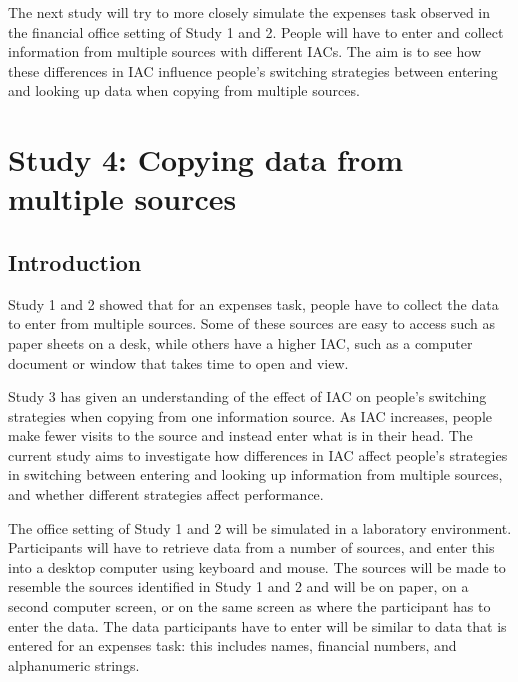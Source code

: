 \documentclass[11pt,oneside]{report}
\begin{document}
\begin{table}
The next study will try to more closely simulate the expenses task observed in the financial office setting of Study 1 and 2. People will have to enter and collect information from multiple sources with different IACs. The aim is to see how these differences in IAC influence people's switching strategies between entering and looking up data when copying from multiple sources. 



\section{Study 4: Copying data from multiple sources}
 
\subsection{Introduction}
Study 1 and 2 showed that for an expenses task, people have to collect the data to enter from multiple sources. Some of these sources are easy to access such as paper sheets on a desk, while others have a higher IAC, such as a computer document or window that takes time to open and view.

Study 3 has given an understanding of the effect of IAC on people's switching strategies when copying from one information source. As IAC increases, people make fewer visits to the source and instead enter what is in their head. 
The current study aims to investigate how differences in IAC affect people's strategies in switching between entering and looking up information from multiple sources, and whether different strategies affect performance.

The office setting of Study 1 and 2 will be simulated in a laboratory environment. Participants will have to retrieve data from a number of sources, and enter this into a desktop computer using keyboard and mouse. The sources will be made to resemble the sources identified in Study 1 and 2 and will be on paper, on a second computer screen, or on the same screen as where the participant has to enter the data. The data participants have to enter will be similar to data that is entered for an expenses task: this includes names, financial numbers, and alphanumeric strings. 


\end{table}
\end{document}
